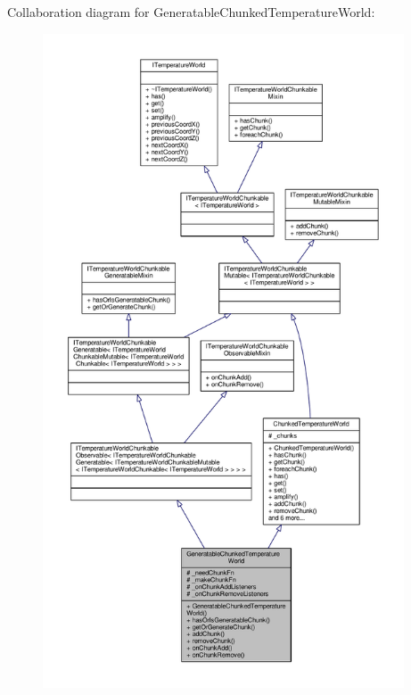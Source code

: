 Collaboration diagram for Generatable\-Chunked\-Temperature\-World\-:
\nopagebreak
\begin{figure}[H]
\begin{center}
\leavevmode
\includegraphics[height=550pt]{class_generatable_chunked_temperature_world__coll__graph}
\end{center}
\end{figure}
